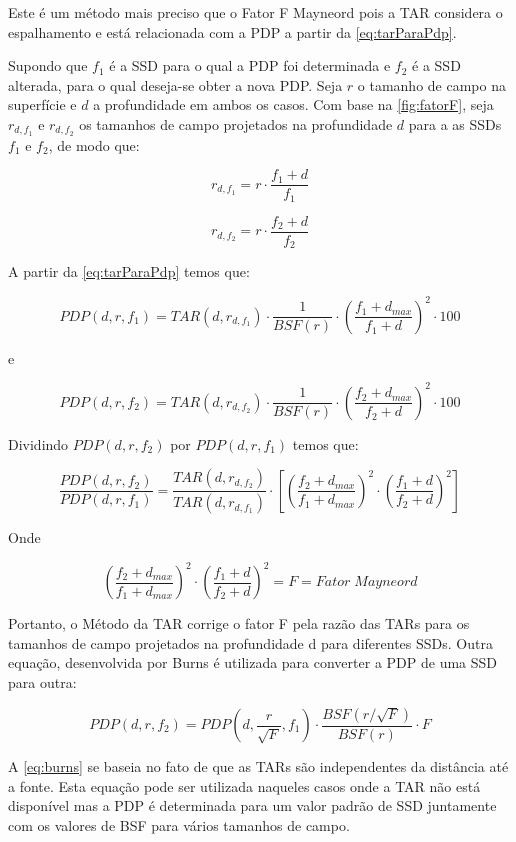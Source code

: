 \documentclass[11pt,a4paper]{article}
\begin{document}
	Este é um método mais preciso que o Fator F Mayneord pois a TAR considera o espalhamento e está relacionada com a PDP a partir da \ref{eq:tarParaPdp}.

	Supondo que $f_1$ é a SSD para o qual a PDP foi determinada e $f_2$ é a SSD alterada, para o qual deseja-se obter a nova PDP. Seja $r$ o tamanho de campo na superfície e $d$ a profundidade em ambos os casos. Com base na \ref{fig:fatorF}, seja $r_{d, f_1}$ e $r_{d, f_2}$ os tamanhos de campo projetados na profundidade $d$ para a as SSDs $f_1$ e $f_2$, de modo que:

		$$r_{d, f_1} = r \cdot \frac{f_1 + d}{f_1}$$

		$$r_{d, f_2} = r \cdot \frac{f_2 + d}{f_2}$$

	A partir da \ref{eq:tarParaPdp} temos que:

		$$PDP(d, r, f_1) = TAR(d, r_{d, f_1}) \cdot \frac{1}{BSF(r)} \cdot \left(\frac{f_1 + d_{max}}{f_1 + d}\right)^2 \cdot 100$$

	e 

		$$PDP(d, r, f_2) = TAR(d, r_{d, f_2}) \cdot \frac{1}{BSF(r)} \cdot \left(\frac{f_2 + d_{max}}{f_2 + d}\right)^2 \cdot 100$$


	Dividindo $PDP(d, r, f_2)$ por $PDP(d, r, f_1)$ temos que:

	\begin{equation}
		\frac{PDP(d, r, f_2)}{PDP(d, r, f_1)} = \frac{TAR(d, r_{d, f_2})}{TAR(d, r_{d, f_1})} \cdot \left[\left(\frac{f_2 + d_{max}}{f_1 + d_{max}}\right)^2 \cdot \left(\frac{f_1 + d}{f_2 + d}\right)^2\right]
		\label{eq:metodoTar}
	\end{equation}

	Onde 

	$$\left(\frac{f_2 + d_{max}}{f_1 + d_{max}}\right)^2 \cdot \left(\frac{f_1 + d}{f_2 + d}\right)^2 = F = Fator \; Mayneord$$

	Portanto, o Método da TAR corrige o fator F pela razão das TARs para os tamanhos de campo projetados na profundidade d para diferentes SSDs. Outra equação, desenvolvida por Burns é utilizada para converter a PDP de uma SSD para outra:

	\begin{equation}
		PDP(d, r, f_2) = PDP(d, \frac{r}{\sqrt{F}}, f_1) \cdot \frac{BSF(r/\sqrt{F})}{BSF(r)} \cdot F
		\label{eq:burns}
	\end{equation}

	A \ref{eq:burns} se baseia no fato de que as TARs são independentes da distância até a fonte. Esta equação pode ser utilizada naqueles casos onde a TAR não está disponível mas a PDP é determinada para um valor padrão de SSD juntamente com os valores de BSF para vários tamanhos de campo. 
\end{document}
